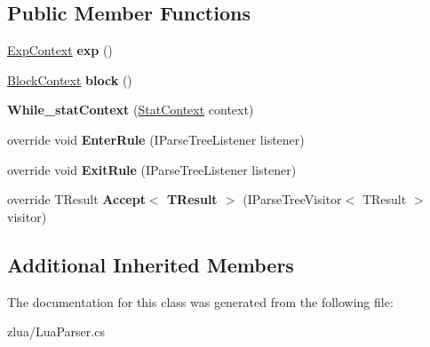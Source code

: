 \subsection*{Public Member Functions}
\begin{DoxyCompactItemize}
\item 
\mbox{\label{classzlua_1_1_lua_parser_1_1_while__stat_context_ac2893e928d89cd4c2dc6a54d729ea6ef}} 
\mbox{\hyperlink{classzlua_1_1_lua_parser_1_1_exp_context}{Exp\+Context}} {\bfseries exp} ()
\item 
\mbox{\label{classzlua_1_1_lua_parser_1_1_while__stat_context_a9c1c8ff5a8e2e4f905e6dd4c7291fd55}} 
\mbox{\hyperlink{classzlua_1_1_lua_parser_1_1_block_context}{Block\+Context}} {\bfseries block} ()
\item 
\mbox{\label{classzlua_1_1_lua_parser_1_1_while__stat_context_aeb7d80364dcbca3f7c0f840def779999}} 
{\bfseries While\+\_\+stat\+Context} (\mbox{\hyperlink{classzlua_1_1_lua_parser_1_1_stat_context}{Stat\+Context}} context)
\item 
\mbox{\label{classzlua_1_1_lua_parser_1_1_while__stat_context_af0606333d74d1938d314048e064bb876}} 
override void {\bfseries Enter\+Rule} (I\+Parse\+Tree\+Listener listener)
\item 
\mbox{\label{classzlua_1_1_lua_parser_1_1_while__stat_context_a2e9aea9a31bdc853a3fa43e90a0cd0d2}} 
override void {\bfseries Exit\+Rule} (I\+Parse\+Tree\+Listener listener)
\item 
\mbox{\label{classzlua_1_1_lua_parser_1_1_while__stat_context_a7ad76cc796ccacbf45e49cda03b15cd5}} 
override T\+Result {\bfseries Accept$<$ T\+Result $>$} (I\+Parse\+Tree\+Visitor$<$ T\+Result $>$ visitor)
\end{DoxyCompactItemize}
\subsection*{Additional Inherited Members}


The documentation for this class was generated from the following file\+:\begin{DoxyCompactItemize}
\item 
zlua/Lua\+Parser.\+cs\end{DoxyCompactItemize}
